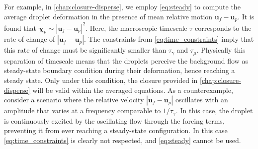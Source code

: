 For example, in \ref{chap:closure-disperse}, we employ \ref{eq:steady} to compute the average droplet deformation in the presence of mean relative motion $\textbf{u}_f-\textbf{u}_p$. 
It is found that $\bm\chi_p \sim |\textbf{u}_f-\textbf{u}_p|^2$. 
Here, the macroscopic timescale $\tau$ corresponds to the rate of change of $|\textbf{u}_f-\textbf{u}_p|$.  
The constraints from \ref{eq:time_constraints} imply that this rate of change must be significantly smaller than $\tau_\gamma$ and $\tau_\mu$. 
Physically this separation of timescale means that the droplets perceive the background flow as steady-state boundary condition during their deformation, hence reaching a steady state.
Only under this condition, the closure provided in  \ref{chap:closure-disperse} will be valid within the averaged equations.  
As a counterexample, consider a scenario where the relative velocity $|\textbf{u}_f-\textbf{u}_p|$ oscillates with an amplitude that varies at a frequency comparable to $1/\tau_\gamma$. 
In this case, the droplet is continuously excited by the oscillating flow through the forcing terms, preventing it from ever reaching a steady-state configuration. 
In this case \ref{eq:time_constraints} is clearly not respected, and \ref{eq:steady} cannot be used. 


